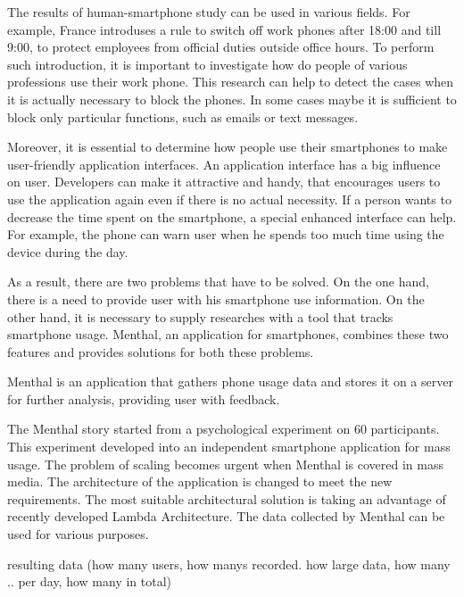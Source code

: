 The results of human-smartphone study can be used in various fields.
For example, France introduses a rule to switch off work phones after 18:00 and till 9:00, to protect employees from official duties outside office hours.
To perform such introduction, it is important to investigate how do people of various professions use their work phone.
This research can help to detect the cases when it is actually necessary to block the phones.
In some cases maybe it is sufficient to block only particular functions, such as emails or text messages.

Moreover, it is essential to determine how people use their smartphones to make user-friendly application interfaces. 
An application interface has a big influence on user.
Developers can make it attractive and handy, that encourages users to use the application again even if there is no actual necessity.
If a person wants to decrease the time spent on the smartphone, a special enhanced interface can help.
For example, the phone can warn user when he spends too much time using the device during the day.  

As a result, there are two problems that have to be solved. 
On the one hand, there is a need to provide user with his smartphone use information.
On the other hand, it is necessary to supply researches with a tool that tracks smartphone usage.
Menthal, an application for smartphones, combines these two features and provides solutions for both these problems. 

Menthal is an application that gathers phone usage data and stores it on a server for further analysis, providing user with feedback.

The Menthal story started from a psychological experiment on 60 participants.
% 
This experiment developed into an independent smartphone application for mass usage. 
% 
The problem of scaling becomes urgent when Menthal is covered in mass media.
% 
The architecture of the application is changed to meet the new requirements.
% 
The most suitable architectural solution is taking an advantage of recently developed Lambda Architecture.
%  
The data collected by Menthal can be used for various purposes.

resulting data (how many users, how manys recorded. how large data, how many .. per day, how many in total)
